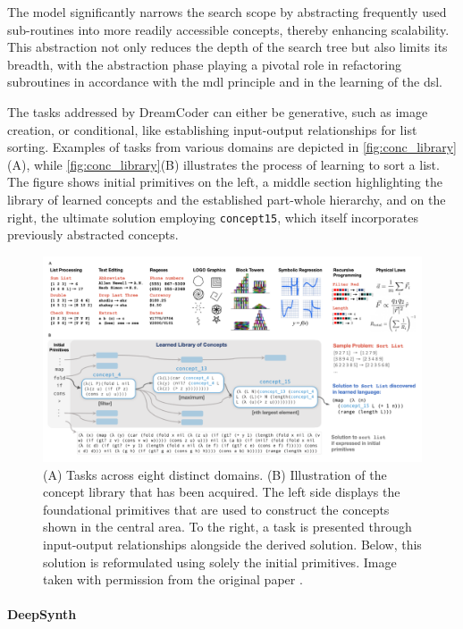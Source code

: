 The model significantly narrows the search scope by abstracting frequently used sub-routines into more readily accessible concepts, thereby enhancing scalability. This abstraction not only reduces the depth of the search tree but also limits its breadth, with the abstraction phase playing a pivotal role in refactoring subroutines in accordance with the \acrlong{mdl} principle and in the learning of the \acrlong{dsl}.

The tasks addressed by DreamCoder can either be generative, such as image creation, or conditional, like establishing input-output relationships for list sorting. Examples of tasks from various domains are depicted in \autoref{fig:conc_library}(A), while \autoref{fig:conc_library}(B) illustrates the process of learning to sort a list. The figure shows initial primitives on the left, a middle section highlighting the library of learned concepts and the established part-whole hierarchy, and on the right, the ultimate solution employing \texttt{concept15}, which itself incorporates previously abstracted concepts.

\begin{figure}[H]
    \centering
    \includegraphics[width=\textwidth]{../img/conc_library.png}
    \caption{(A) Tasks across eight distinct domains. (B) Illustration of the concept library that has been acquired. The left side displays the foundational primitives that are used to construct the concepts shown in the central area. To the right, a task is presented through input-output relationships alongside the derived solution. Below, this solution is reformulated using solely the initial primitives. Image taken with permission from the original paper \cite{ellisDreamCoderBootstrappingInductive2021}.}
    \label{fig:conc_library}
\end{figure}


\paragraph*{DeepSynth}

